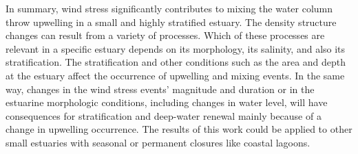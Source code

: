 \documentclass[tesis.tex]{subfiles}
\begin{document}
In summary, wind stress significantly contributes to mixing the water column throw upwelling in a small and highly stratified estuary. The density structure changes can result from a variety of processes. Which of these processes are relevant in a specific estuary depends on its morphology, its salinity, and also its stratification. The stratification and other conditions such as the area and depth at the estuary affect the occurrence of upwelling and mixing events. In the same way, changes in the wind stress events' magnitude and duration or in the estuarine morphologic conditions, including changes in water level, will have consequences for stratification and deep-water renewal mainly because of a change in upwelling occurrence. The results of this work could be applied to other small estuaries with seasonal or permanent closures like coastal lagoons.\\
\end{document}
